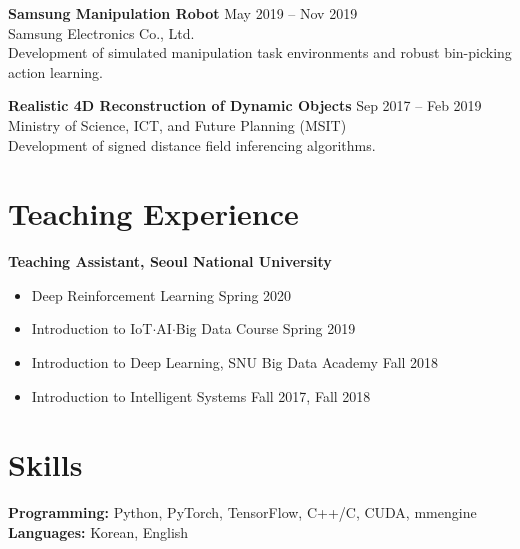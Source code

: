 \documentclass[10pt]{article}
\begin{document}
\textbf{Samsung Manipulation Robot} \hfill May 2019 -- Nov 2019 \\
Samsung Electronics Co., Ltd. \\
Development of simulated manipulation task environments and robust bin-picking action learning.

\textbf{Realistic 4D Reconstruction of Dynamic Objects} \hfill Sep 2017 -- Feb 2019 \\
Ministry of Science, ICT, and Future Planning (MSIT) \\
Development of signed distance field inferencing algorithms.

\section{Teaching Experience}
\textbf{Teaching Assistant, Seoul National University}
\begin{itemize}[leftmargin=1.5em, itemsep=1pt, topsep=2pt]
  \item Deep Reinforcement Learning \hfill Spring 2020
  \item Introduction to IoT$\cdot$AI$\cdot$Big Data Course \hfill Spring 2019
  \item Introduction to Deep Learning, SNU Big Data Academy \hfill Fall 2018
  \item Introduction to Intelligent Systems \hfill Fall 2017, Fall 2018
\end{itemize}

\section{Skills}
\textbf{Programming:} Python, PyTorch, TensorFlow, C++/C, CUDA, mmengine \\
\textbf{Languages:} Korean, English
\end{document}
